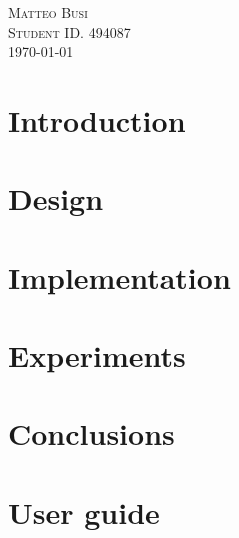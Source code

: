 \documentclass[12pt, oneside, a4paper]{article}
\begin{document}
\begin{titlepage}
		\Large %
		\textsc{Matteo Busi}\\[0.4cm]%
		\large
		\textsc{Student ID. 494087}\\[3cm]
		
		
		{\large \today}\\[2cm] %
		
		
		
		
		\vfill %
		
	\end{titlepage}

	\section{Introduction} \label{sec:intro}
		
		
	\section{Design} \label{sec:design}
		
		
	\section{Implementation} \label{sec:implementation}
		
			
	\section{Experiments} \label{sec:experiments}
		

	\section{Conclusions} \label{sec:conclusions}
		
	
	\section{User guide} \label{sec:guide}
		

	
\end{document}
